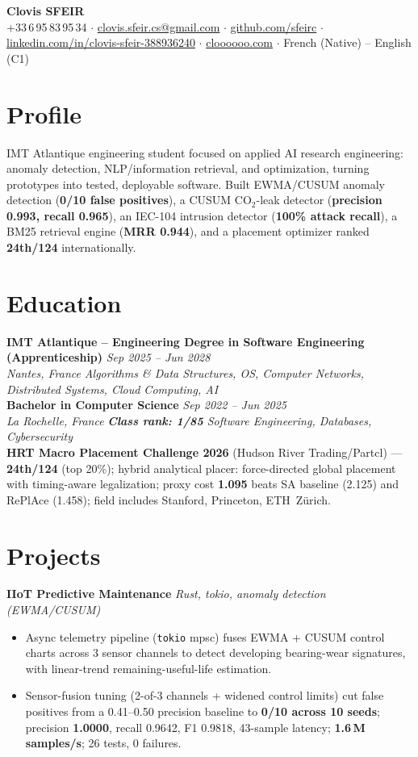 \documentclass[10pt]{article}
\newcommand{\entry}[4]{%
  \noindent\textbf{#1} \hfill \textit{#2} \\
  \textit{#3} \hfill \textit{#4}\\[-0.22em]
}
\newcommand{\projectentry}[2]{%
  \noindent\textbf{#1} \hfill \textit{#2}\\[-0.3em]
}
\begin{document}
\fontsize{9.3pt}{11pt}\selectfont
\begin{center}
  {\LARGE \textbf{Clovis SFEIR}}\\[0.3em]
  +33\,6\,95\,83\,95\,34 \;$\cdot$\; \href{mailto:clovis.sfeir.cs@gmail.com}{clovis.sfeir.cs@gmail.com} \;$\cdot$\;
  \href{https://github.com/sfeirc}{github.com/sfeirc} \;$\cdot$\;
  \href{https://linkedin.com/in/clovis-sfeir-388936240}{linkedin.com/in/clovis-sfeir-388936240} \;$\cdot$\;
  \href{https://cloooooo.com}{cloooooo.com} \;$\cdot$\; French (Native) -- English (C1)
\end{center}

\section*{Profile}
IMT Atlantique engineering student focused on applied AI research engineering: anomaly detection, NLP/information retrieval, and optimization, turning prototypes into tested, deployable software. Built EWMA/CUSUM anomaly detection (\textbf{0/10 false positives}), a CUSUM CO$_2$-leak detector (\textbf{precision 0.993, recall 0.965}), an IEC-104 intrusion detector (\textbf{100\% attack recall}), a BM25 retrieval engine (\textbf{MRR 0.944}), and a placement optimizer ranked \textbf{24th/124} internationally.

\section*{Education}
\entry{IMT Atlantique -- Engineering Degree in Software Engineering (Apprenticeship)}{Sep 2025 -- Jun 2028}{Nantes, France}{Algorithms \& Data Structures, OS, Computer Networks, Distributed Systems, Cloud Computing, AI}
\entry{Bachelor in Computer Science}{Sep 2022 -- Jun 2025}{La Rochelle, France}{\textbf{Class rank: 1/85} \textbar{} Software Engineering, Databases, Cybersecurity}
\noindent\textbf{HRT Macro Placement Challenge 2026} (Hudson River Trading/Partcl) --- \textbf{24th/124} (top 20\%); hybrid analytical placer: force-directed global placement with timing-aware legalization; proxy cost \textbf{1.095} beats SA baseline (2.125) and RePlAce (1.458); field includes Stanford, Princeton, ETH~Z\"urich.

\section*{Projects}

\projectentry{IIoT Predictive Maintenance}{Rust, tokio, anomaly detection (EWMA/CUSUM)}
\begin{itemize}
  \item Async telemetry pipeline (\texttt{tokio} mpsc) fuses EWMA + CUSUM control charts across 3 sensor channels to detect developing bearing-wear signatures, with linear-trend remaining-useful-life estimation.
  \item Sensor-fusion tuning (2-of-3 channels + widened control limits) cut false positives from a 0.41--0.50 precision baseline to \textbf{0/10 across 10 seeds}; precision \textbf{1.0000}, recall 0.9642, F1 0.9818, 43-sample latency; \textbf{1.6\,M samples/s}; 26 tests, 0 failures.
\end{itemize}
\end{document}
